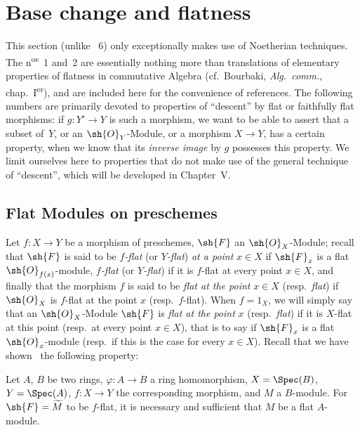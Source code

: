 \section{Base change and flatness}
\label{section:IV.2}


This section (unlike \textsection~6) only exceptionally makes use of Noetherian techniques.
The n\textsuperscript{os}~1 and~2 are essentially nothing more than translations of elementary properties of flatness in commutative Algebra (cf.~Bourbaki, \emph{Alg.~comm.}, chap.~I\textsuperscript{er}), and are included here for the convenience of references.
The following numbers are primarily devoted to properties of ``descent'' by flat or faithfully flat morphisms: if $g:Y'\to Y$ is such a morphism, we want to be able to assert that a subset of~$Y$, or an $\sh{O}_Y$-Module, or a morphism $X\to Y$, has a certain property, when we know that its \emph{inverse image} by $g$ possesses this property.
We limit ourselves here to properties that do not make use of the general technique of ``descent'', which will be developed in Chapter~V.

\subsection{Flat Modules on preschemes}
\label{subsection:IV.2.1}

\begin{env}[2.1.1]
\label{IV.2.1.1}
Let $f:X\to Y$ be a morphism of preschemes, $\sh{F}$ an $\sh{O}_X$-Module;
recall~ that $\sh{F}$ is said to be \emph{$f$-flat} (or \emph{$Y$-flat}) \emph{at a point} $x\in X$ if $\sh{F}_x$ is a flat $\sh{O}_{f(x)}$-module, \emph{$f$-flat} (or \emph{$Y$-flat}) if it is $f$-flat at every point $x\in X$, and finally that the morphism $f$ is said to be \emph{flat at the point} $x\in X$ (resp.\ \emph{flat}) if $\sh{O}_X$ is $f$-flat at the point $x$ (resp.\ $f$-flat).
When $f=1_X$, we will simply say that an $\sh{O}_X$-Module $\sh{F}$ is \emph{flat at the point} $x$ (resp.\ \emph{flat}) if it is $X$-flat at this point (resp.\ at every point $x\in X$), that is to say if $\sh{F}_x$ is a flat $\sh{O}_x$-module (resp.\ if this is the case for every $x\in X$).
Recall that we have shown~ the following property:
\end{env}

\begin{proposition}[2.1.2]
\label{IV.2.1.2}
Let $A$, $B$ be two rings, $\varphi:A\to B$ a ring homomorphism, $X=\Spec(B)$, $Y=\Spec(A)$, $f:X\to Y$ the corresponding morphism, and $M$ a $B$-module.
For $\sh{F}=\widetilde{M}$ to be $f$-flat, it is necessary and sufficient that $M$ be a flat $A$-module.
\end{proposition}


